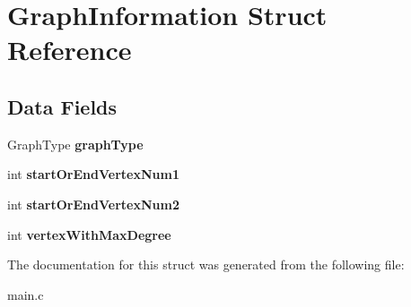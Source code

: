 \hypertarget{struct_graph_information}{}\section{Graph\+Information Struct Reference}
\label{struct_graph_information}
\subsection*{Data Fields}
\begin{DoxyCompactItemize}
\item 
Graph\+Type {\bfseries graph\+Type}\hypertarget{struct_graph_information_a80bbbf6160956ad58049319f02c4b8e2}{}\label{struct_graph_information_a80bbbf6160956ad58049319f02c4b8e2}

\item 
int {\bfseries start\+Or\+End\+Vertex\+Num1}\hypertarget{struct_graph_information_a2ecf6cc5ac75416436a0433a7504917a}{}\label{struct_graph_information_a2ecf6cc5ac75416436a0433a7504917a}

\item 
int {\bfseries start\+Or\+End\+Vertex\+Num2}\hypertarget{struct_graph_information_a122f329d6ed1f6b854050cd8fa8658c5}{}\label{struct_graph_information_a122f329d6ed1f6b854050cd8fa8658c5}

\item 
int {\bfseries vertex\+With\+Max\+Degree}\hypertarget{struct_graph_information_a3098ead8a6cfdf40df2cd25f46025a41}{}\label{struct_graph_information_a3098ead8a6cfdf40df2cd25f46025a41}

\end{DoxyCompactItemize}


The documentation for this struct was generated from the following file\+:\begin{DoxyCompactItemize}
\item 
main.\+c\end{DoxyCompactItemize}
